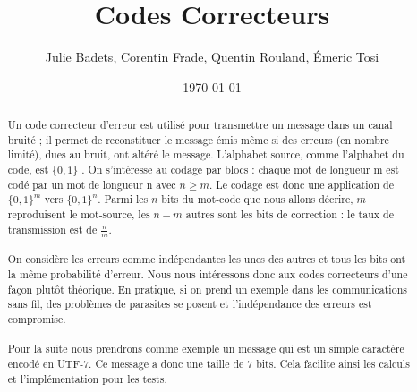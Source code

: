 \documentclass[a4paper,11pt]{report}
\title{Codes Correcteurs}
\author{Julie Badets, Corentin Frade, Quentin Rouland, Émeric Tosi}
\date{\today}
\begin{document}
    \maketitle{} %

    \begin{abstract} %
        \paragraph{}
Un code correcteur d'erreur est utilisé pour transmettre un message dans un canal bruité ;
il permet de reconstituer le message émis même si des erreurs (en nombre limité), dues au bruit, ont altéré le message.
L'alphabet source, comme l'alphabet du code, est $\{0,1\}$ .
On s'intéresse au codage par blocs : chaque mot de longueur m est codé par un mot de longueur n avec $n \geq m$.
Le codage est donc une application de $\{0,1\}^m$  vers $\{0,1\}^n$.
Parmi les $n$ bits du mot-code que nous allons décrire, $m$ reproduisent le mot-source,
les $n-m$ autres sont les bits de correction : le taux de transmission est de $\frac{n}{m}$.
        \paragraph{}
On considère les erreurs comme indépendantes les unes des autres et tous les bits ont la même probabilité d'erreur.
Nous nous intéressons donc aux codes correcteurs d'une façon plutôt théorique.
En pratique, si on prend un exemple dans les communications sans fil,
des problèmes de parasites se posent et l'indépendance des erreurs est compromise.
        \paragraph{}
Pour la suite nous prendrons comme exemple un message qui est un simple caractère encodé en UTF-7.
Ce message a donc une taille de 7 bits.
Cela facilite ainsi les calculs et l'implémentation pour les tests.
    \end{abstract}

    \setcounter{tocdepth}{1} %
    \renewcommand{\contentsname}{Sommaire} %
    \tableofcontents{} %


    
    
    
    
%    


    
\end{document}
